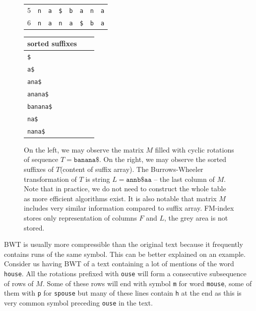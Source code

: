 \begin{figure}
{\begin{tabular}{l|c|ccccc|c|}
	5 & {\tt n}		& \multicolumn{1}{c|}{{\color[HTML]{C0C0C0} \tt a}}		& \multicolumn{1}{c|}{{\color[HTML]{C0C0C0} \tt \$}}& \multicolumn{1}{c|}{{\color[HTML]{C0C0C0} \tt b}}	& \multicolumn{1}{c|}{{\color[HTML]{C0C0C0} \tt a}}	& {\color[HTML]{C0C0C0} \tt n}  & {\tt a}  \\ \cline{2-8} 
	6 & {\tt n}		& \multicolumn{1}{c|}{{\color[HTML]{C0C0C0} \tt a}}		& \multicolumn{1}{c|}{{\color[HTML]{C0C0C0} \tt n}}	& \multicolumn{1}{c|}{{\color[HTML]{C0C0C0} \tt a}}	& \multicolumn{1}{c|}{{\color[HTML]{C0C0C0} \tt \$}}& {\color[HTML]{C0C0C0} \tt b}  & {\tt a}  \\ \cline{2-8} 
	\end{tabular}
	\hspace{4em}
	\begin{tabular}{l l l}
		sorted suffixes\\
	\hline
		\tt \$ \\
		\tt a\$ \\
		\tt ana\$ \\
		\tt anana\$ \\
		\tt banana\$ \\
		\tt na\$ \\
		\tt nana\$ \\
	\end{tabular}
	}
	\caption[TODO]{On the left, we may observe the matrix $M$ filled with cyclic rotations of sequence
	$T = \mathtt{banana\$}$. On the right, we may observe the sorted suffixes of $T$(content of suffix array). The
	Burrows-Wheeler transformation of $T$ is string $L=\mathtt{annb\$aa}$ -- the last column of $M$.
	Note that in practice, we do not need to construct the whole table as more efficient algorithms exist.
	It is also notable that matrix $M$ includes very similar information compared to suffix array.
	FM-index stores only representation of columns $F$ and $L$, the grey area is not stored.
	}
	\label{obr:BWT}
\end{figure}

BWT is usually more compressible than the original text because it frequently contains runs of the same
symbol. This can be better explained on an example. Consider us having BWT of a text containing
a lot of mentions of the word {\tt house}. All the rotations prefixed with {\tt ouse} will form a
consecutive subsequence of rows of $M$. Some of these rows will end with symbol {\tt m} for word {\tt mouse},
some of them with {\tt p} for {\tt spouse} but many of these lines contain {\tt h} at the end as this
is very common symbol preceding {\tt ouse} in the text.

